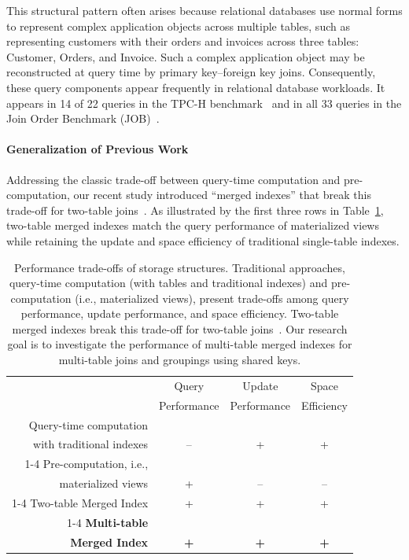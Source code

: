 \documentclass[sigconf, pdfa, nonacm]{acmart}
\begin{document}
This structural pattern often arises because relational databases use normal forms to represent complex application objects across multiple tables, such as representing customers with their orders and invoices across three tables: Customer, Orders, and Invoice.
Such a complex application object may be reconstructed at query time by primary key--foreign key joins.
Consequently, these query components appear frequently in relational database workloads. It appears in 14 of 22 queries in the TPC-H benchmark~\cite{tpch2017spec} and in all 33 queries in the Join Order Benchmark (JOB)~\cite{leis2015job}.

\paragraph{Generalization of Previous Work}

Addressing the classic trade-off between query-time computation and pre-computation, our recent study introduced ``merged indexes'' that break this trade-off for two-table joins~\cite{lyu2025indexing}. As illustrated by the first three rows in Table~\ref{tab:performance_comparison}, two-table merged indexes match the query performance of materialized views while retaining the update and space efficiency of traditional single-table indexes.

\begin{table}[htbp]
    \centering
    \caption{Performance trade-offs of storage structures. \textnormal{Traditional approaches, query-time computation (with tables and traditional indexes) and pre-computation (i.e., materialized views), present trade-offs among query performance, update performance, and space efficiency. Two-table merged indexes break this trade-off for two-table joins~\cite{lyu2025indexing}. Our research goal is to investigate the performance of multi-table merged indexes for multi-table joins and groupings using shared keys.}}\label{tab:performance_comparison}
    \small
    \begin{tabular}{r c c c}
        \toprule
         & Query & Update & Space \\
         & Performance & Performance & Efficiency \\
        \midrule
        Query-time computation &&&\\
        with traditional indexes & -- & + & + \\
        \cmidrule{1-4}
        Pre-computation, i.e., &&&\\
        materialized views & + & -- & -- \\
        \cmidrule{1-4}
        Two-table Merged Index & + & + & + \\
        \cmidrule{1-4}
        \textbf{Multi-table}&&&\\
        \textbf{Merged Index} & \textbf{+} & \textbf{+} & \textbf{+} \\
        \bottomrule
    \end{tabular}
\end{table}
\end{document}
